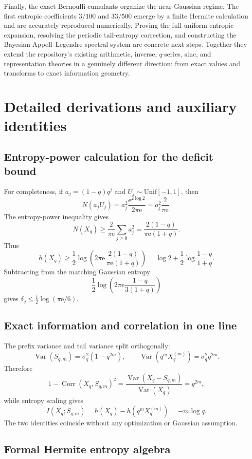 \documentclass[11pt,oneside]{article}
\theoremstyle{definition}
\theoremstyle{remark}
\newcommand{\Var}{\operatorname{Var}}
\newcommand{\Corr}{\operatorname{Corr}}
\newcommand{\e}{\mathrm e}
\begin{document}
Finally, the exact Bernoulli cumulants organize the near-Gaussian regime.  The
first entropic coefficients $3/100$ and $33/500$ emerge by a finite Hermite
calculation and are accurately reproduced numerically.  Proving the full uniform
entropic expansion, resolving the periodic tail-entropy correction, and
constructing the Bayesian Appell--Legendre spectral system are concrete next
steps.  Together they extend the repository's existing arithmetic, inverse,
$q$-series, sinc, and representation theories in a genuinely different direction:
from exact values and transforms to exact information geometry.

\appendix

\section{Detailed derivations and auxiliary identities}
\label{app:derivations}

\subsection{Entropy-power calculation for the deficit bound}

For completeness, if $a_j=(1-q)q^j$ and $U_j\sim\mathrm{Unif}[-1,1]$, then
\[
 N(a_jU_j)=a_j^2\frac{\e^{2\log2}}{2\pi\e}
 =a_j^2\frac{2}{\pi\e}.
\]
The entropy-power inequality gives
\[
 N(X_q)\ge\frac{2}{\pi\e}\sum_{j\ge0}a_j^2
 =\frac{2(1-q)}{\pi\e(1+q)}.
\]
Thus
\[
 h(X_q)\ge\frac12\log\left(2\pi\e\,
 \frac{2(1-q)}{\pi\e(1+q)}\right)
 =\log2+\frac12\log\frac{1-q}{1+q}.
\]
Subtracting from the matching Gaussian entropy
\[
 \frac12\log\left(2\pi\e\frac{1-q}{3(1+q)}\right)
\]
gives $\delta_q\le\tfrac12\log(\pi\e/6)$.

\subsection{Exact information and correlation in one line}

The prefix variance and tail variance split orthogonally:
\[
 \Var(S_{q,m})=\sigma_q^2(1-q^{2m}),
 \qquad
 \Var(q^mX_q^{(m)})=\sigma_q^2q^{2m}.
\]
Therefore
\[
 1-\Corr(X_q,S_{q,m})^2
 =\frac{\Var(X_q-S_{q,m})}{\Var(X_q)}=q^{2m},
\]
while entropy scaling gives
\[
 I(X_q;S_{q,m})
 =h(X_q)-h(q^mX_q^{(m)})=-m\log q.
\]
The two identities coincide without any optimization or Gaussian assumption.

\subsection{Formal Hermite entropy algebra}
\end{document}
